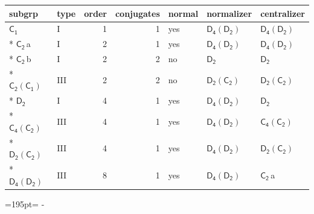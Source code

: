 \documentclass[10pt,a4paper]{article}
\newcommand{\needspace}[1]{\par\penalty-100\begingroup\dimen0=#1\relax\dimen2=\pagegoal
  \advance\dimen2-\pagetotal\ifdim\dimen0>\dimen2\relax\ifdim\dimen2>0pt\vfil\break\fi\fi
  \endgroup}
\numberwithin{equation}{section}
\newcommand{\grp}[1]{\mathsf{#1}}
\newcommand{\clsletter}[1]{\,{\scriptsize\color{black!55}#1}}
\begin{document}
{\small\begin{longtable}{@{}llrrlll@{}}\toprule
subgrp & type & order & conjugates & normal & normalizer & centralizer\\\midrule\endhead
\bottomrule\endfoot\endlastfoot
\href{../../../rotation/data/pdf/C1.pdf}{$\grp{C_{1}}$} & I & 1 & 1 & yes & \href{D4-D2.pdf}{$\grp{D_{4}}(\grp{D_{2}})$} & \href{D4-D2.pdf}{$\grp{D_{4}}(\grp{D_{2}})$}\\*
\href{../../../rotation/data/pdf/C2.pdf}{$\grp{C_{2}}$}\clsletter{a} & I & 2 & 1 & yes & \href{D4-D2.pdf}{$\grp{D_{4}}(\grp{D_{2}})$} & \href{D4-D2.pdf}{$\grp{D_{4}}(\grp{D_{2}})$}\\*
\href{../../../rotation/data/pdf/C2.pdf}{$\grp{C_{2}}$}\clsletter{b} & I & 2 & 2 & no & \href{../../../rotation/data/pdf/D2.pdf}{$\grp{D_{2}}$} & \href{../../../rotation/data/pdf/D2.pdf}{$\grp{D_{2}}$}\\*
\href{C2-C1.pdf}{$\grp{C_{2}}(\grp{C_{1}})$} & III & 2 & 2 & no & \href{D2-C2.pdf}{$\grp{D_{2}}(\grp{C_{2}})$} & \href{D2-C2.pdf}{$\grp{D_{2}}(\grp{C_{2}})$}\\*
\href{../../../rotation/data/pdf/D2.pdf}{$\grp{D_{2}}$} & I & 4 & 1 & yes & \href{D4-D2.pdf}{$\grp{D_{4}}(\grp{D_{2}})$} & \href{../../../rotation/data/pdf/D2.pdf}{$\grp{D_{2}}$}\\*
\href{C4-C2.pdf}{$\grp{C_{4}}(\grp{C_{2}})$} & III & 4 & 1 & yes & \href{D4-D2.pdf}{$\grp{D_{4}}(\grp{D_{2}})$} & \href{C4-C2.pdf}{$\grp{C_{4}}(\grp{C_{2}})$}\\*
\href{D2-C2.pdf}{$\grp{D_{2}}(\grp{C_{2}})$} & III & 4 & 1 & yes & \href{D4-D2.pdf}{$\grp{D_{4}}(\grp{D_{2}})$} & \href{D2-C2.pdf}{$\grp{D_{2}}(\grp{C_{2}})$}\\*
\href{D4-D2.pdf}{$\grp{D_{4}}(\grp{D_{2}})$} & III & 8 & 1 & yes & \href{D4-D2.pdf}{$\grp{D_{4}}(\grp{D_{2}})$} & \href{../../../rotation/data/pdf/C2.pdf}{$\grp{C_{2}}$}\clsletter{a}\\
\bottomrule\end{longtable}}
\needspace{195pt}
\end{document}
